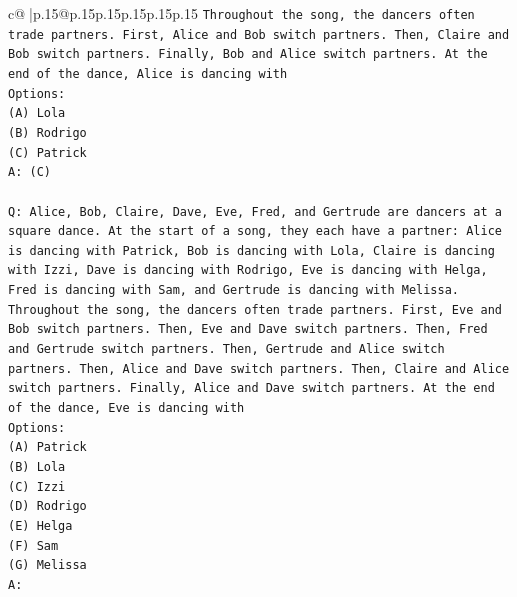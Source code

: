 \documentclass{article}
\begin{document}
{\begin{supertabular}{c@{$\;$}|p{.15\linewidth}@{}p{.15\linewidth}p{.15\linewidth}p{.15\linewidth}p{.15\linewidth}p{.15\linewidth}}
{{{\texttt{Throughout the song, the dancers often trade partners. First, Alice and Bob switch partners. Then, Claire and Bob switch partners. Finally, Bob and Alice switch partners. At the end of the dance, Alice is dancing with} \\
\texttt{Options:} \\
\texttt{(A) Lola} \\
\texttt{(B) Rodrigo} \\
\texttt{(C) Patrick} \\
\texttt{A: (C)} \\
\\ 
\texttt{Q: Alice, Bob, Claire, Dave, Eve, Fred, and Gertrude are dancers at a square dance. At the start of a song, they each have a partner: Alice is dancing with Patrick, Bob is dancing with Lola, Claire is dancing with Izzi, Dave is dancing with Rodrigo, Eve is dancing with Helga, Fred is dancing with Sam, and Gertrude is dancing with Melissa.} \\
\texttt{Throughout the song, the dancers often trade partners. First, Eve and Bob switch partners. Then, Eve and Dave switch partners. Then, Fred and Gertrude switch partners. Then, Gertrude and Alice switch partners. Then, Alice and Dave switch partners. Then, Claire and Alice switch partners. Finally, Alice and Dave switch partners. At the end of the dance, Eve is dancing with} \\
\texttt{Options:} \\
\texttt{(A) Patrick} \\
\texttt{(B) Lola} \\
\texttt{(C) Izzi} \\
\texttt{(D) Rodrigo} \\
\texttt{(E) Helga} \\
\texttt{(F) Sam} \\
\texttt{(G) Melissa} \\
\texttt{A:} \\
            }
        }
    }
     \\ \\


\end{supertabular}}
\end{document}
